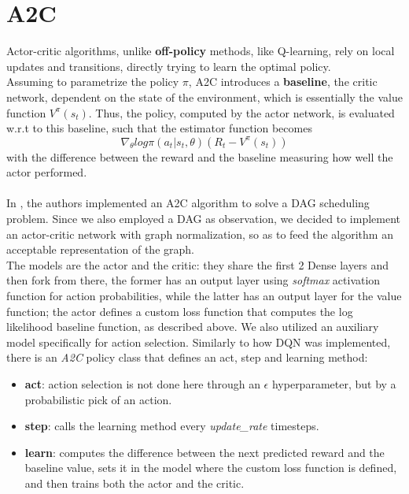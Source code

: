 \section{A2C}
Actor-critic algorithms, unlike \textbf{off-policy} methods, like Q-learning, rely on local updates and transitions, directly trying to learn the optimal policy.\\
Assuming to parametrize the policy $\pi$, A2C introduces a \textbf{baseline}, the critic network, dependent on the state of the environment, which is essentially the value function \textbf{$V^{\pi}(s_t)$}. Thus, the policy, computed by the actor network, is evaluated w.r.t to this baseline, such that the estimator function becomes $$\nabla_{\theta} log \pi(a_t | s_t,\theta) (R_t - V^{\pi}(s_t))$$ with the difference between the reward and the baseline measuring how well the actor performed. \\ \\
In \cite{a2c}, the authors implemented an A2C algorithm to solve a DAG scheduling problem. Since we also employed a DAG as observation, we decided to implement an actor-critic network with graph normalization, so as to feed the algorithm an acceptable representation of the graph. \\ 
The models are the actor and the critic: they share the first 2 Dense layers and then fork from there, the former has an output layer using \textit{softmax} activation function for action probabilities, while the latter has an output layer for the value function; the actor defines a custom loss function that computes the log likelihood baseline function, as described above.  We also utilized an auxiliary model specifically for action selection. Similarly to how DQN was implemented, there is an \textit{A2C} policy class that defines an act, step and learning method:
\begin{itemize}
\item \textbf{act}: action selection is not done here through an $\epsilon$ hyperparameter, but by a probabilistic pick of an action.
\item \textbf{step}: calls the learning method every \textit{update\_rate} timesteps.
\item \textbf{learn}: computes the difference between the next predicted reward and the baseline value, sets it in the model where the custom loss function is defined, and then trains both the actor and the critic.
\end{itemize}

 